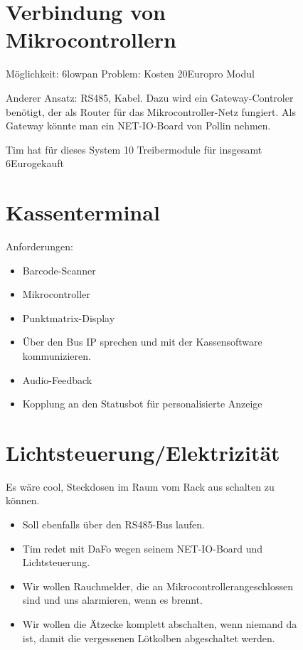 \documentclass[parskip]{scrartcl}
\newcommand\euro{Euro}
\newcommand\uc{Mikrocontroller}
\begin{document}
\begin{figure}
\section{Verbindung von Mikrocontrollern}

Möglichkeit: 6lowpan
Problem: Kosten 20\euro pro Modul

Anderer Ansatz: RS485, Kabel. Dazu wird ein Gateway-Controler benötigt, der als Router für das \uc-Netz fungiert.
Als Gateway könnte man ein NET-IO-Board von Pollin nehmen.

Tim hat für dieses System 10 Treibermodule für insgesamt 6\euro gekauft

\end{figure}
\begin{figure}
\section{Kassenterminal}

Anforderungen:
\begin{itemize}
\item{} Barcode-Scanner
\item{} \uc
\item{} Punktmatrix-Display
\item{} Über den Bus IP sprechen und mit der Kassensoftware kommunizieren.
\item{} Audio-Feedback
\item{} Kopplung an den Statusbot für personalisierte Anzeige
\end{itemize}

\end{figure}
\begin{figure}
\section{Lichtsteuerung/Elektrizität}

Es wäre cool, Steckdosen im Raum vom Rack aus schalten zu können.

\begin{itemize}
\item{} Soll ebenfalls über den RS485-Bus laufen.
\item{} Tim redet mit DaFo wegen seinem NET-IO-Board und Lichtsteuerung.
\item{} Wir wollen Rauchmelder, die an \uc angeschlossen sind und uns alarmieren, wenn es brennt.
\item{} Wir wollen die Ätzecke komplett abschalten, wenn niemand da ist, damit die vergessenen Lötkolben abgeschaltet werden.
\end{itemize}

\end{figure}
\end{document}
